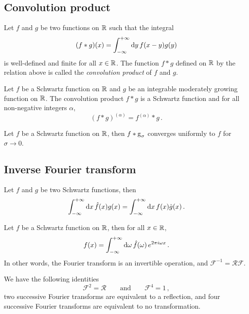 \subsection{Convolution product}
\begin{definition}
  Let $f$ and $g$ be two functions on $\mathbb{R}$ such that the integral
  \begin{equation}
    (f\ast g)(x)=\int_{-\infty}^{+\infty}\mathrm{d}{y}\,f(x-y)g(y)
  \end{equation}
  is well-defined and finite for all $x\in\mathbb{R}$. The function $f\ast g$ defined on $\mathbb{R}$ by
  the relation above is called the \emph{convolution product} of $f$ and $g$.
\end{definition}
\begin{theorem}
  Let $f$ be a Schwartz function on $\mathbb{R}$ and $g$ be an integrable moderately growing
  function on $\mathbb{R}$. The convolution product $f\ast g$ is a Schwartz function and for all
  non-negative integers $\alpha$,
  \begin{equation}
    (f\ast g)^{(\alpha)}=f^{(\alpha)}\ast g\,.
  \end{equation}
\end{theorem}
\begin{theorem}
  Let $f$ be a Schwartz function on $\mathbb{R}$, then $f\ast \operatorname{g}_{\sigma}$ converges uniformly
  to $f$ for $\sigma\to 0$.
\end{theorem}
\subsection{Inverse Fourier transform}
\begin{theorem}
  Let $f$ and $g$ be two Schwartz functions, then
  \begin{equation}
    \int_{-\infty}^{+\infty}\mathrm{d}{x}\,\hat{f}(x)g(x)=\int_{-\infty}^{+\infty}\mathrm{d}{x}\,f(x)\hat{g}(x)\,.
  \end{equation}
\end{theorem}
\begin{theorem}
  Let $f$ be a Schwartz function on $\mathbb{R}$, then for all $x\in\mathbb{R}$,
  \begin{equation}
    f(x)=\int_{-\infty}^{+\infty}\mathrm{d}{\omega}\,\hat{f}(\omega)\,e^{2\pi i\omega x}\,.
  \end{equation}
  In other words, the Fourier transform is an invertible operation, and
  $\mathcal{F}^{-1}=\mathcal{R}\mathcal{F}$.
\end{theorem}
\begin{corollary}
  We have the following identities
  \begin{equation}
    \mathcal{F}^2=\mathcal{R}\qquad\text{and}\qquad\mathcal{F}^4=1\,,
  \end{equation}
  \ie two successive Fourier transforms are equivalent to a reflection, and four
  successive Fourier transforms are equivalent to no transformation.
\end{corollary}
